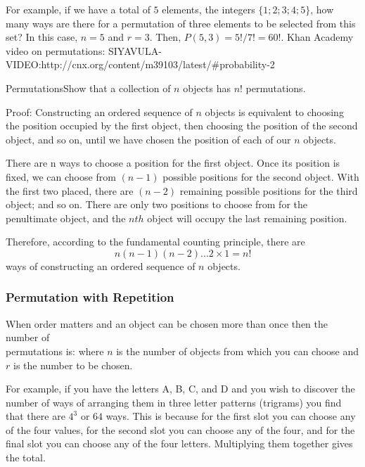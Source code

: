 For example, if we have a total of $5$ elements, the integers $\{1; 2; 3; 4; 5\}$, how many ways are there for a permutation of three elements to be selected from this set? In this case, $n = 5$ and $r = 3$. Then, $P(5,3) = 5!/7! = 60!$.
Khan Academy video on permutations: SIYAVULA-VIDEO:http://cnx.org/content/m39103/latest/#probability-2
\begin{wex}{Permutations}{Show that a collection of $n$ objects has $n!$ permutations.}{Proof: Constructing an ordered sequence of $n$ objects is equivalent to choosing the position occupied by the first object, then choosing the position of the second object, and so on, until we have chosen the position of each of our $n$ objects.

There are n ways to choose a position for the first object. Once its position is fixed, we can choose from $(n-1)$ possible positions for the second object. With the first two placed, there are $(n-2)$ remaining possible positions for the third object; and so on. There are only two positions to choose from for the penultimate object, and the $nth$ object will occupy the last remaining position.

Therefore, according to the fundamental counting principle, there are $$n(n-1)(n-2)...2 \times 1 = n!$$ ways of constructing an ordered sequence of $n$ objects.
}
\end{wex}

\subsubsection{Permutation with Repetition}

When order matters and an object can be chosen more than once then the number of \\permutations is:
where $n$ is the number of objects from which you can choose and $r$ is the number to be chosen.

For example, if you have the letters A, B, C, and D and you wish to discover the number of ways of arranging them in three letter patterns (trigrams) you find that there are $4^3$ or $64$ ways. This is because for the first slot you can choose any of the four values, for the second slot you can choose any of the four, and for the final slot you can choose any of the four letters. Multiplying them together gives the total.


